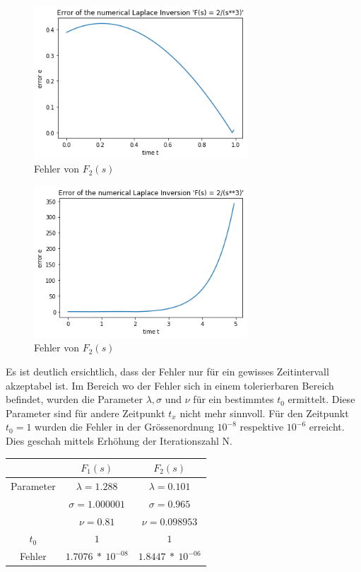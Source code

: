 \documentclass{scrartcl}
\begin{document}
\begin{figure}[h]
\begin{center}
\includegraphics[width=8cm]{"Error_2divide_s_pow3"}
\caption{Fehler von $F_{2}(s)$}
\end{center}
\end{figure}

\begin{figure}[h]
\begin{center}
\includegraphics[width=8cm]{"Error_2divide_s_pow3_bis_tgleich5"}
\caption{Fehler von $F_{2}(s)$}
\end{center}
\end{figure}


Es ist deutlich ersichtlich, dass der Fehler nur für ein gewisses Zeitintervall akzeptabel ist. Im Bereich wo der Fehler sich in einem tolerierbaren Bereich befindet, wurden die Parameter $\lambda, \sigma $ und $\nu $ für ein bestimmtes $t_{0}$ ermittelt. 
Diese Parameter sind für andere Zeitpunkt $t_{x}$ nicht mehr sinnvoll. 
Für den Zeitpunkt $t_{0}=1$ wurden die Fehler in der Grössenordnung $10^{-8}$ respektive $10^{-6}$ erreicht. 
Dies geschah mittels Erhöhung der Iterationszahl N.

\begin{center}
\begin{tabular}[c]{c|c|c}
& $F_{1}(s)$ & $F_{2}(s)$ \\
\hline
Parameter & $\lambda=1.288$ & $\lambda=0.101$ \\
 & $\sigma=1.000001$ & $\sigma=0.965$ \\
 & $\nu=0.81$ & $\nu=0.098953$ \\
\hline
$t_{0}$ & $1$ & $1$ \\
\hline
Fehler & $1.7076~*~10^{-08}$ & $1.8447~*~10^{-06}$ \\
\end{tabular}
\end{center}
\end{document}
